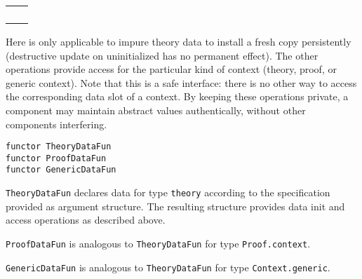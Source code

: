 \begin{isabellebody}
\begin{isamarkuptext}
  \medskip
  \begin{tabular}{ll}
  \isa{init{\isacharcolon}\ theory\ {\isasymrightarrow}\ theory} \\
  \isa{get{\isacharcolon}\ context\ {\isasymrightarrow}\ T} \\
  \isa{put{\isacharcolon}\ T\ {\isasymrightarrow}\ context\ {\isasymrightarrow}\ context} \\
  \isa{map{\isacharcolon}\ {\isacharparenleft}T\ {\isasymrightarrow}\ T{\isacharparenright}\ {\isasymrightarrow}\ context\ {\isasymrightarrow}\ context} \\
  \end{tabular}
  \medskip

  \noindent Here  is only applicable to impure theory
  data to install a fresh copy persistently (destructive update on
  uninitialized has no permanent effect).  The other operations provide
  access for the particular kind of context (theory, proof, or generic
  context).  Note that this is a safe interface: there is no other way
  to access the corresponding data slot of a context.  By keeping
  these operations private, a component may maintain abstract values
  authentically, without other components interfering.%
\end{isamarkuptext}%
\isamarkuptrue%
%
\isadelimmlref
%
\endisadelimmlref
%
\isatagmlref
%
\begin{isamarkuptext}%
\begin{mldecls}
  \verb|functor TheoryDataFun| \\
  \verb|functor ProofDataFun| \\
  \verb|functor GenericDataFun| \\
  \end{mldecls}

  \begin{description}

  \item \verb|TheoryDataFun| declares data for
  type \verb|theory| according to the specification provided as
  argument structure.  The resulting structure provides data init and
  access operations as described above.

  \item \verb|ProofDataFun| is analogous to
  \verb|TheoryDataFun| for type \verb|Proof.context|.

  \item \verb|GenericDataFun| is analogous to
  \verb|TheoryDataFun| for type \verb|Context.generic|.


\end{description}
\end{isamarkuptext}
\end{isabellebody}
